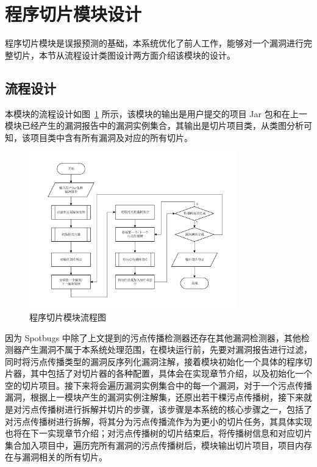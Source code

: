 \section{程序切片模块设计}

程序切片模块是误报预测的基础，本系统优化了前人工作，能够对一个漏洞进行完整切片，本节从流程设计类图设计两方面介绍该模块的设计。\\
\subsection{流程设计}

本模块的流程设计如图~\ref{sliceProcessing} 所示，该模块的输出是用户提交的项目 Jar 包和在上一模块已经产生的漏洞报告中的漏洞实例集合，其输出是切片项目类，从类图分析可知，该项目类中含有所有漏洞及对应的所有切片。

\begin{figure}[!htb]
    \centering
    \includegraphics[width=0.8\textwidth]{FIGs/chapter3/sliceProcessing.pdf}
    \caption{程序切片模块流程图}\label{sliceProcessing}
\end{figure}

因为 Spotbugs 中除了上文提到的污点传播检测器还存在其他漏洞检测器，其他检测器产生漏洞不属于本系统处理范围，在模块运行前，先要对漏洞报告进行过滤，同时将污点传播类型的漏洞反序列化漏洞注解，接着模块初始化一个具体的程序切片器，其中包括了对切片器的各种配置，具体会在实现章节介绍，以及初始化一个空的切片项目。接下来将会遍历漏洞实例集合中的每一个漏洞，对于一个污点传播漏洞，根据上一模块产生的漏洞实例注解集，还原出若干棵污点传播树，接下来就是对污点传播树进行拆解并切片的步骤，该步骤是本系统的核心步骤之一，包括了对污点传播树进行拆解，将其分为污点传播流作为为更小的切片任务，其具体实现也将在下一实现章节介绍；对污点传播树的切片结束后，将传播树信息和对应切片集合加入项目中，遍历完所有漏洞的污点传播树后，模块输出切片项目，项目内存在与漏洞相关的所有切片。\\

